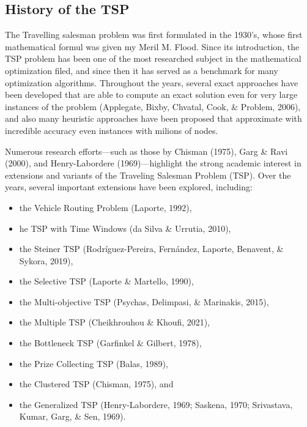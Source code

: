 \documentclass{article}
\begin{document}
\subsection{History of the TSP}
The Travelling salesman problem was first formulated in the 1930's, whose first mathematical formul was given my Meril M. Flood.
Since its introduction, the TSP problem has been one of the most researched subject in the mathematical optimization filed, and since then it has served
as a benchmark for many optimization algorithms.
Throughout the years, several exact approaches have been developed that are able to compute an exact solution even for very large instances of 
the problem (Applegate, Bixby, Chvatal, Cook, \& Problem, 2006), and also many heuristic approaches have been proposed that approximate with incredible 
accuracy even instances with milions of nodes.  

Numerous research efforts—such as those by Chisman (1975), Garg \& Ravi (2000), and Henry-Labordere (1969)—highlight the strong academic 
interest in extensions and variants of the Traveling Salesman Problem (TSP). Over the years, several important extensions have been explored, 
including:
\begin{itemize}
	\item the Vehicle Routing Problem (Laporte, 1992),

	\item he TSP with Time Windows (da Silva \& Urrutia, 2010),
	
	\item the Steiner TSP (Rodríguez-Pereira, Fernández, Laporte, Benavent, \& Sykora, 2019),
	
	\item the Selective TSP (Laporte \& Martello, 1990),
	
	\item the Multi-objective TSP (Psychas, Delimpasi, \& Marinakis, 2015),
	
	\item the Multiple TSP (Cheikhrouhou \& Khoufi, 2021),
	
	\item the Bottleneck TSP (Garfinkel \& Gilbert, 1978),
	
	\item the Prize Collecting TSP (Balas, 1989),
	
	\item the Clustered TSP (Chisman, 1975), and
	
	\item the Generalized TSP (Henry-Labordere, 1969; Saskena, 1970; Srivastava, Kumar, Garg, \& Sen, 1969).
\end{itemize}
\end{document}
